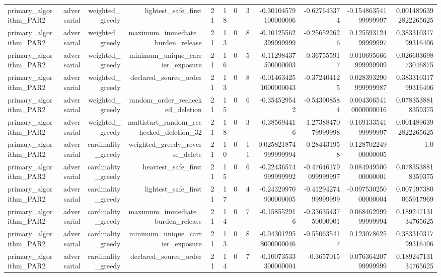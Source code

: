 {\begin{longtable}{lrrrrrrrrrrr}
primary\_algorithm\_PAR2 & adversarial & weighted\_greedy & lightest\_safe\_first & 21 & 18 & 0 & 3 & -0.30104579100000006 & -0.627643374 & -0.15486354199999997 & 0.0014896392822265625 \\
primary\_algorithm\_PAR2 & adversarial & weighted\_greedy & maximum\_immediate\_burden\_release & 21 & 13 & 0 & 8 & -0.10125562399999999 & -0.256522626 & 0.12559312499999997 & 0.38331031799316406 \\
primary\_algorithm\_PAR2 & adversarial & weighted\_greedy & minimum\_unique\_carrier\_exposure & 21 & 16 & 0 & 5 & -0.11298437500000003 & -0.367555917 & -0.010695666999999909 & 0.02660369873046875 \\
primary\_algorithm\_PAR2 & adversarial & weighted\_greedy & declared\_source\_order & 21 & 13 & 0 & 8 & -0.014634251000000043 & -0.372404125 & 0.028393290999999987 & 0.38331031799316406 \\
primary\_algorithm\_PAR2 & adversarial & weighted\_greedy & random\_order\_rechecked\_deletion & 21 & 15 & 0 & 6 & -0.354529542 & -0.543908584 & 0.0043665410000000016 & 0.0783538818359375 \\
primary\_algorithm\_PAR2 & adversarial & weighted\_greedy & multistart\_random\_rechecked\_deletion\_32 & 21 & 18 & 0 & 3 & -0.385694416 & -1.2738847079999998 & -0.16913354199999997 & 0.0014896392822265625 \\
primary\_algorithm\_PAR2 & adversarial & cardinality\_greedy & weighted\_greedy\_reverse\_delete & 21 & 10 & 0 & 11 & 0.025821874999999994 & -0.284431958 & 0.12870224900000005 & 1.0 \\
primary\_algorithm\_PAR2 & adversarial & cardinality\_greedy & heaviest\_safe\_first & 21 & 15 & 0 & 6 & -0.22436574999999992 & -0.47646179099999997 & 0.08494950000000001 & 0.0783538818359375 \\
primary\_algorithm\_PAR2 & adversarial & cardinality\_greedy & lightest\_safe\_first & 21 & 17 & 0 & 4 & -0.24320970900000005 & -0.4129427499999999 & -0.09753025000000004 & 0.007197380065917969 \\
primary\_algorithm\_PAR2 & adversarial & cardinality\_greedy & maximum\_immediate\_burden\_release & 21 & 14 & 0 & 7 & -0.158552916 & -0.3363543750000001 & 0.06846299999999994 & 0.18924713134765625 \\
primary\_algorithm\_PAR2 & adversarial & cardinality\_greedy & minimum\_unique\_carrier\_exposure & 21 & 13 & 0 & 8 & -0.043012958000000046 & -0.550635417 & 0.123078625 & 0.38331031799316406 \\
primary\_algorithm\_PAR2 & adversarial & cardinality\_greedy & declared\_source\_order & 21 & 14 & 0 & 7 & -0.10073533300000004 & -0.3657015 & 0.07636420799999999 & 0.18924713134765625 \\

\end{longtable}}
